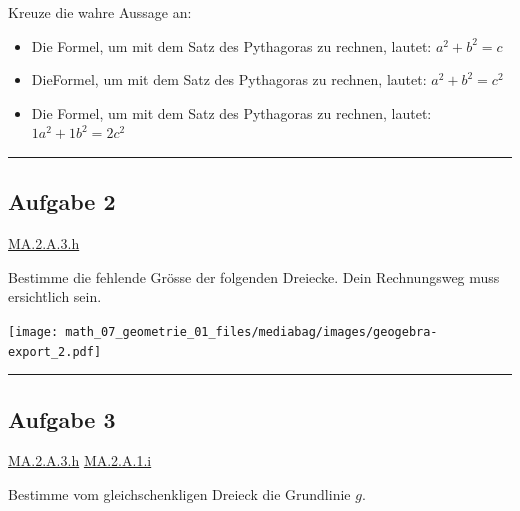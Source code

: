 \documentclass[
  letterpaper,
  DIV=11]{scrartcl}
\providecommand{\tightlist}{%
  \setlength{\itemsep}{0pt}\setlength{\parskip}{0pt}}\usepackage{longtable,booktabs,array}
\begin{document}
Kreuze die wahre Aussage an:

\begin{itemize}
\tightlist
\item
  Die Formel, um mit dem Satz des Pythagoras zu rechnen, lautet:
  \(a^2 + b^2 = c\)
\item
  DieFormel, um mit dem Satz des Pythagoras zu rechnen, lautet:
  \(a^2 + b^2 = c^2\)
\item
  Die Formel, um mit dem Satz des Pythagoras zu rechnen, lautet:
  \(1a^2 +1b^2 = 2c^2\)
\end{itemize}

\begin{center}\rule{0.5\linewidth}{0.5pt}\end{center}

\subsection{Aufgabe 2}\label{aufgabe-2}

\href{https://be.lehrplan.ch/101PkqMkqzxUs36hHHkYEzbSuMg99acT6}{MA.2.A.3.h}

Bestimme die fehlende Grösse der folgenden Dreiecke. Dein Rechnungsweg
muss ersichtlich sein.

\begin{figure}


\caption{\label{fig-aufgabe}}

\end{figure}%

\texttt{[image: math\_07\_geometrie\_01\_files/mediabag/images/geogebra-export\_2.pdf]}

\begin{center}\rule{0.5\linewidth}{0.5pt}\end{center}

\subsection{Aufgabe 3}\label{aufgabe-3}

\href{https://be.lehrplan.ch/101PkqMkqzxUs36hHHkYEzbSuMg99acT6}{MA.2.A.3.h}
\href{https://be.lehrplan.ch/101ynfPky7BFpr8TcpDdhJGF7bGBXERpT}{MA.2.A.1.i}

Bestimme vom gleichschenkligen Dreieck die Grundlinie \(g\).
\end{document}
